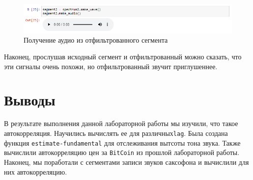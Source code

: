 \documentclass[a4paper]{article}
\begin{document}
            \begin{figure}[H]
                \centering
                \includegraphics[width=\textwidth]{ex_4_spectr_2_audio.png}
                \caption{Получение аудио из отфильтрованного сегмента}
                \label{fig:ex_4_spectr_2_audio}
            \end{figure}
            
            Наконец, прослушав исходный сегмент и отфильтрованный можно сказать, что эти сигналы очень похожи, но отфильтрованный звучит приглушеннее.
            
    \newpage
        \section{Выводы}
            В результате выполнения данной лабораторной работы мы изучили, что такое автокорреляция. Научились вычислять ее для различных\texttt{lag}. Была создана функция \texttt{estimate-fundamental} для отслеживания вытсоты тона звука. Также вычислили автокорреляцию цен за \texttt{BitCoin} из прошлой лабораторной работы. Наконец, мы поработали с сегментами записи звуков саксофона и вычислили для них автокорреляцию.
           
           
            
\end{document}
